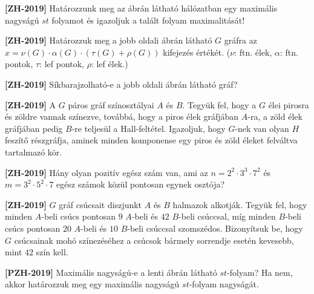 \documentclass[a4paper, 12pt]{article}
\begin{document}
    \noindent{}
    \noindent{}
    \begin{enumerate}
        \item \textbf{[ZH-2019]} Határozzunk meg az ábrán látható hálózatban egy maximális nagyságú $st$ folyamot és igazoljuk a talált folyam maximalitását!
        \begin{figure}[ht]
            \centering
            
        \end{figure}

        \begin{minipage}{0.5\textwidth}
            \item \textbf{[ZH-2019]} Határozzuk meg a jobb oldali ábrán látható $G$ gráfra az $x=\nu(G)\cdot\alpha(G)\cdot(\tau(G) + \rho(G))$ kifejezés értékét. ($\nu$: ftn. élek, $\alpha$: ftn. pontok, $\tau$: lef pontok, $\rho$: lef élek.)
            \item \textbf{[ZH-2019]} Síkbarajzolható-e a jobb oldali ábrán látható gráf?
        \end{minipage}
        \begin{minipage}{0.4\textwidth}
            \centering
            
        \end{minipage}
        \item \textbf{[ZH-2019]} A $G$ páros gráf színosztályai $A$ és $B$. Tegyük fel, hogy a $G$ élei pirosra és zöldre vannak színezve, továbbá, hogy a piros élek gráfjában $A$-ra, a zöld élek gráfjában pedig $B$-re teljesül a Hall-feltétel. Igazoljuk, hogy $G$-nek van olyan $H$ feszítő részgráfja, aminek minden komponense egy piros és zöld éleket felváltva tartalmazó kör.
        \item \textbf{[ZH-2019]} Hány olyan pozitív egész szám van, ami az $n=2^2\cdot3^3\cdot7^2$ és $m=3^2\cdot5^2\cdot7$ egész számok közül pontosan egynek osztója?
        \item \textbf{[ZH-2019]} $G$ gráf csúcsait diszjunkt $A$ és $B$ halmazok alkotják. Tegyük fel, hogy minden $A$-beli csúcs pontosan $9$ $A$-beli és $42$ $B$-beli csúccsal, míg minden $B$-beli csúcs pontosan $20$ $A$-beli és $10$ $B$-beli csúccsal szomszédos. Bizonyítsuk be, hogy $G$ csúcsainak mohó színezéséhez a csúcsok bármely sorrendje esetén kevesebb, mint $42$ szín kell.

        \item \textbf{[PZH-2019]} Maximális nagyságú-e a lenti ábrán látható $st$-folyam? Ha nem, akkor határozzuk meg egy maximális nagyságú $st$-folyam nagyságát.
        \begin{figure}[ht]
            \centering
            
        \end{figure}


\end{enumerate}
\end{document}
